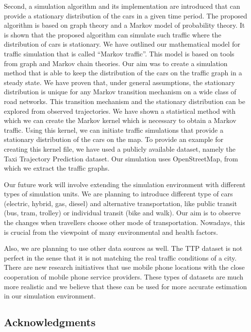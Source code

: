 \documentclass[b5paper,12pt]{report}
\theoremstyle{definition}
\begin{document}
Second, a simulation algorithm and its implementation are introduced that can provide a stationary distribution of the cars in a given time period. The proposed algorithm is based on graph theory and a Markov model of probability theory. It is shown that the proposed algorithm can simulate such traffic where the distribution of cars is stationary. We have outlined our mathematical model for traffic simulation that is called \enquote{Markov traffic}. This model is based on tools from graph and Markov chain theories. Our aim was to create a simulation method that is able to keep the distribution of the cars on the traffic graph in a steady state. We have proven that, under general assumptions, the stationary distribution is unique for any Markov transition mechanism on a wide class of road networks. This transition mechanism and the stationary distribution can be explored from observed trajectories. We have shown a statistical method with which we can create the Markov kernel which is necessary to obtain a Markov traffic. Using this kernel, we can initiate traffic simulations that provide a stationary distribution of the cars on the map. To provide an example for creating this kernel file, we have used a publicly available dataset, namely the Taxi Trajectory Prediction dataset. Our simulation uses OpenStreetMap, from which we extract the traffic graphs.

Our future work will involve extending the simulation environment with different types of simulation units. We are planning to introduce different type of cars (electric, hybrid, gas, diesel) and alternative transportation, like public transit (bus, tram, trolley) or individual transit (bike and walk). Our aim is to observe the changes when travellers choose other mode of transportation. Nowadays, this is crucial from the viewpoint of many environmental and health factors.

Also, we are planning to use other data sources as well. The TTP dataset is not perfect in the sense that it is not matching the real traffic conditions of a city. There are new research initiatives that use mobile phone locations with the close cooperation of mobile phone service providers. These types of datasets are much more realistic and we believe that these can be used for more accurate estimation in our simulation environment.

\newpage
\subsection*{Acknowledgments}
\end{document}
